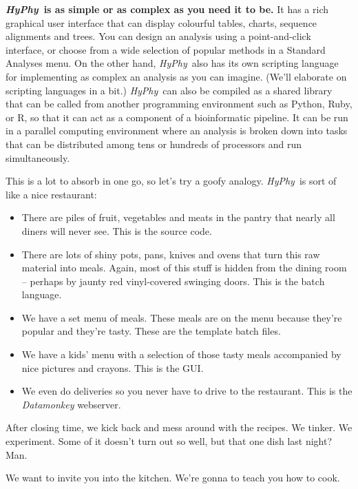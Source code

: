 \documentclass[12pt]{book}
\newcommand{\hyphy}{\textit{HyPhy}}
\begin{document}
\textbf{\hyphy\ is as simple or as complex as you need it to be.}  It has a rich graphical user interface that can display colourful tables, charts, sequence alignments and trees.  You can design an analysis using a point-and-click interface, or choose from a wide selection of popular methods in a Standard Analyses menu.  On the other hand, \hyphy\ also has its own scripting language for implementing as complex an analysis as you can imagine.  (We'll elaborate on scripting languages in a bit.)  \hyphy\ can also be compiled as a shared library that can be called from another programming environment such as Python, Ruby, or R, so that it can act as a component of a bioinformatic pipeline.  It can be run in a parallel computing environment where an analysis is broken down into tasks that can be distributed among tens or hundreds of processors and run simultaneously.  

This is a lot to absorb in one go, so let's try a goofy analogy.  \hyphy\ is sort of like a nice restaurant:
\begin{itemize}
\itemsep 0pt
\item There are piles of fruit, vegetables and meats in the pantry that nearly all diners will never see.  This is the source code.  
\item There are lots of shiny pots, pans, knives and ovens that turn this raw material into meals.  Again, most of this stuff is hidden from the dining room -- perhaps by jaunty red vinyl-covered swinging doors.  This is the batch language.
\item We have a set menu of meals.  These meals are on the menu because they're popular and they're tasty.  These are the template batch files.  
\item We have a kids' menu with a selection of those tasty meals accompanied by nice pictures and crayons.  This is the GUI.
\item We even do deliveries so you never have to drive to the restaurant.  This is the {\it Datamonkey} webserver.
\end{itemize}

\noindent After closing time, we kick back and mess around with the recipes.  We tinker.  We experiment.  Some of it doesn't turn out so well, but that one dish last night?  Man.  

\vspace{1em}
We want to invite you into the kitchen.  We're gonna to teach you how to cook.


\end{document}
